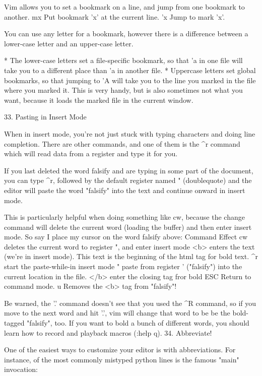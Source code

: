 \documentclass[a4paper, 12pt]{article}
\begin{document}
      Vim allows you to set a bookmark on a line, and jump from one bookmark to another.
      mx	Put bookmark 'x' at the current line.
      'x	Jump to mark 'x'.

      You can use any letter for a bookmark, however there is a difference between a lower-case letter and an upper-case letter.

          * The lower-case letters set a file-specific bookmark, so that 'a in one file will take you to a different place than 'a in another file.
          * Uppercase letters set global bookmarks, so that jumping to 'A will take you to the line you marked in the file where you marked it. This is very handy, but is also sometimes not what you want, because it loads the marked file in the current window. 

  33. Pasting in Insert Mode

      When in insert mode, you're not just stuck with typing characters and doing line completion. There are other commands, and one of them is the ^r command which will read data from a register and type it for you.

      If you last deleted the word falsify and are typing in some part of the document, you can type ^r, followed by the default register named " (doublequote) and the editor will paste the word "falsify" into the text and continue onward in insert mode.

      This is particularly helpful when doing something like cw, because the change command will delete the current word (loading the buffer) and then enter insert mode. So say I place my cursor on the word falsify above:
      Command	Effect
      cw	deletes the current word to register ", and enter insert mode
      <b>	enters the text (we're in insert mode). This text is the beginning of the html tag for bold text.
      ^r	start the paste-while-in insert mode
      "	paste from register ' ("falsify") into the current location in the file.
      </b>	enter the closing tag fror bold
      ESC	Return to command mode.
      u	Removes the <b> tag from "falsify"!

      Be warned, the '.' command doesn't see that you used the ^R command, so if you move to the next word and hit '.', vim will change that word to be be the bold-tagged "falsify", too. If you want to bold a bunch of different words, you should learn how to record and playback macros (:help q).
  34. Abbreviate!

      One of the easiest ways to customize your editor is with abbreviations. For instance, of the most commonly mistyped python lines is the famous "main" invocation:
\end{document}
